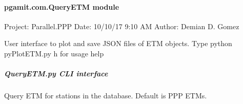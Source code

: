 \documentclass[letterpaper,10pt,english]{sphinxmanual}
\begin{document}
\paragraph{pgamit.com.QueryETM module}
\label{\detokenize{pgamit.com:module-pgamit.com.QueryETM}}\label{\detokenize{pgamit.com:pgamit-com-queryetm-module}}
\sphinxAtStartPar
Project: Parallel.PPP
Date: 10/10/17 9:10 AM
Author: Demian D. Gomez

\sphinxAtStartPar
User interface to plot and save JSON files of ETM objects.
Type python pyPlotETM.py \sphinxhyphen{}h for usage help

\begin{fulllineitems}
\label{\detokenize{pgamit.com:pgamit.com.QueryETM.from_file}}
\pysigstartsignatures
\pysiglinewithargsret
{}
{\sphinxparamcomma {}\sphinxparamcomma {}}
{}
\pysigstopsignatures
\end{fulllineitems}


\begin{fulllineitems}
\label{\detokenize{pgamit.com:pgamit.com.QueryETM.main}}
\pysigstartsignatures
\pysiglinewithargsret
{}
{}
{}
\pysigstopsignatures
\end{fulllineitems}



\subparagraph{QueryETM.py \sphinxhyphen{} CLI interface}
\label{\detokenize{pgamit.com:QueryETM.py---CLI-interface}}
\sphinxAtStartPar
Query ETM for stations in the database. Default is PPP ETMs.
\end{document}
